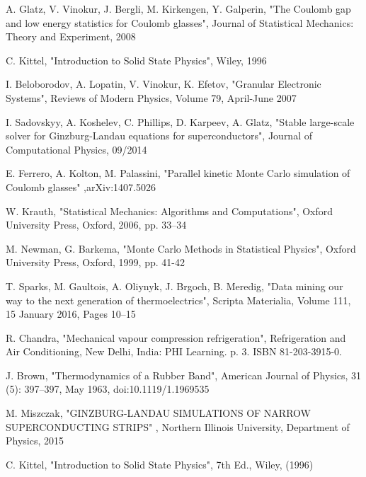\begin{thebibliography}{10}
 A. Glatz, V. Vinokur, J. Bergli, M. Kirkengen, Y. Galperin, "The Coulomb gap and low energy statistics for Coulomb glasses", Journal of Statistical Mechanics: Theory and Experiment, 2008

 C. Kittel, "Introduction to Solid State Physics", Wiley, 1996

 I. Beloborodov, A. Lopatin, V. Vinokur, K. Efetov, "Granular Electronic Systems", Reviews of Modern Physics, Volume 79, April-June 2007

 I. Sadovskyy, A. Koshelev, C. Phillips, D. Karpeev, A. Glatz, "Stable large-scale solver for Ginzburg-Landau equations for superconductors", Journal of Computational Physics, 09/2014

 E. Ferrero, A. Kolton, M. Palassini, "Parallel kinetic Monte Carlo simulation of Coulomb glasses" ,arXiv:1407.5026

 W. Krauth, "Statistical Mechanics: Algorithms and Computations", Oxford University Press, Oxford, 2006, pp. 33–34

 M. Newman, G. Barkema, "Monte Carlo Methods in Statistical Physics", Oxford University Press, Oxford, 1999, pp. 41-42

 T. Sparks, M. Gaultois, A. Oliynyk, J. Brgoch, B. Meredig, "Data mining our way to the next generation of thermoelectrics", Scripta Materialia, Volume 111, 15 January 2016, Pages 10–15

 R. Chandra, "Mechanical vapour compression refrigeration", Refrigeration and Air Conditioning, New Delhi, India: PHI Learning. p. 3. ISBN 81-203-3915-0.

 J. Brown, "Thermodynamics of a Rubber Band", American Journal of Physics, 31 (5): 397–397, May 1963, doi:10.1119/1.1969535

 M. Miszczak, "GINZBURG-LANDAU SIMULATIONS OF NARROW SUPERCONDUCTING STRIPS" , Northern Illinois University, Department of Physics, 2015

 C. Kittel, "Introduction to Solid State Physics", 7th Ed., Wiley, (1996)

\end{thebibliography}

